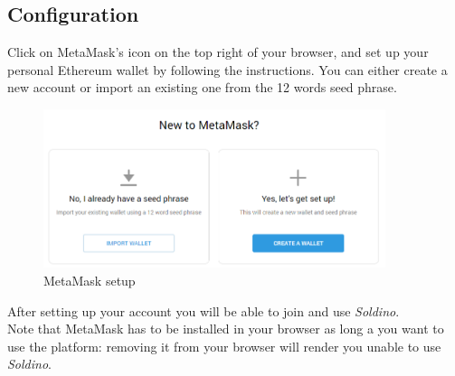 	\subsection{Configuration}
	Click on MetaMask's icon on the top right of your browser, and set up your 
	personal Ethereum wallet by following the instructions. You can either 
	create a new account or import an existing one from the 12 words seed phrase.
	\begin{figure}[H]
		\includegraphics[width=10cm]{res/images/metamask_select.png}
		\centering
		\caption{MetaMask setup}
	\end{figure}
	\noindent After setting up your account you will be able to join and use 
	\textit{Soldino}.
	\newline \\
	Note that MetaMask has to be installed in your browser as long a you want 
	to use the platform: removing it from your browser will render you unable 
	to use \textit{Soldino}.
